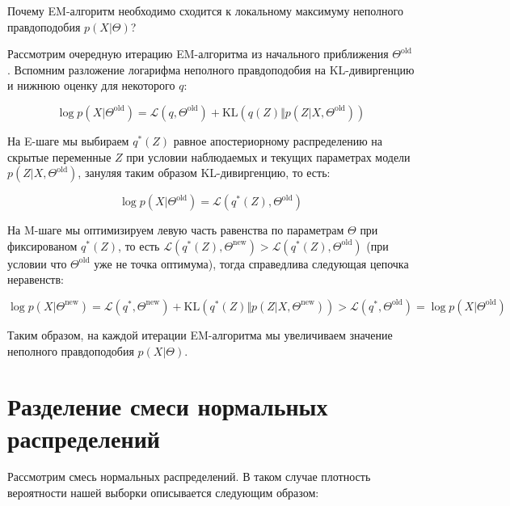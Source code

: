 \documentclass[12pt,a4paper]{article}
\begin{document}
\begin{vkProblem}
    Почему EM-алгоритм необходимо сходится к локальному максимуму неполного правдоподобия $p(X\vert\Theta)$?
\end{vkProblem}
\begin{esSolution}
    Рассмотрим очередную итерацию EM-алгоритма из начального приближения $\Theta^{\text{old}}$. Вспомним разложение логарифма неполного правдоподобия на KL-дивиргенцию и нижнюю оценку для некоторого $q$:
    
    \begin{equation*}
        \log p(X|\Theta^{\text{old}}) = \mathcal{L}(q, \Theta^{\text{old}}) + \text{KL}(q(Z) \Vert p(Z|X, \Theta^{\text{old}}))
    \end{equation*}
    
    На E-шаге мы выбираем $q^*(Z)$ равное апостериорному распределению на скрытые переменные $Z$ при условии наблюдаемых и текущих параметрах модели $p(Z|X, \Theta^{\text{old}})$, зануляя таким образом KL-дивиргенцию, то есть:
    
    \begin{equation*}
        \log p(X|\Theta^{\text{old}}) = \mathcal{L}(q^*(Z), \Theta^{\text{old}})
    \end{equation*}
    
    На M-шаге мы оптимизируем левую часть равенства по параметрам $\Theta$ при фиксированом $q^*(Z)$, то есть $\mathcal{L}(q^*(Z), \Theta^{\text{new}}) > \mathcal{L}(q^*(Z), \Theta^{\text{old}})$ (при условии что $\Theta^{\text{old}}$ уже не точка оптимума), тогда справедлива следующая цепочка неравенств:
    
    \begin{equation*}
        \log p(X|\Theta^{\text{new}}) = \mathcal{L}(q^*, \Theta^{\text{new}}) + \text{KL}(q^*(Z) \Vert p(Z|X, \Theta^{\text{new}}))
        > \mathcal{L}(q^*, \Theta^{\text{old}})
        = \log p(X|\Theta^{\text{old}})
    \end{equation*}
    
    Таким образом, на каждой итерации EM-алгоритма мы увеличиваем значение неполного правдоподобия $p(X\vert\Theta)$.
\end{esSolution}

\section{Разделение смеси нормальных распределений}

Рассмотрим смесь нормальных распределений. В таком случае плотность вероятности нашей выборки описывается следующим образом:
\end{document}
